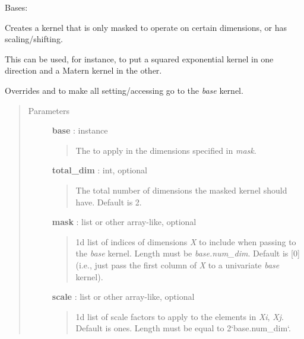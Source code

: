 \documentclass[letterpaper,10pt,english]{sphinxmanual}
\begin{document}
\begin{fulllineitems}
\label{gptools.kernel:gptools.kernel.core.MaskedKernel}
Bases: {\hyperref[gptools.kernel:gptools.kernel.core.Kernel]{}}

Creates a kernel that is only masked to operate on certain dimensions, or has scaling/shifting.

This can be used, for instance, to put a squared exponential kernel in one
direction and a Matern kernel in the other.

Overrides {\hyperref[gptools.kernel:gptools.kernel.core.MaskedKernel.__getattribute__]{}} and {\hyperref[gptools.kernel:gptools.kernel.core.MaskedKernel.__setattr__]{}} to make all
setting/accessing go to the \emph{base} kernel.
\begin{quote}\begin{description}
\item[{Parameters}] \leavevmode
\textbf{base} : {\hyperref[gptools.kernel:gptools.kernel.core.Kernel]{}} instance
\begin{quote}

The {\hyperref[gptools.kernel:gptools.kernel.core.Kernel]{}} to apply in the dimensions specified in \emph{mask}.
\end{quote}

\textbf{total\_dim} : int, optional
\begin{quote}

The total number of dimensions the masked kernel should have. Default
is 2.
\end{quote}

\textbf{mask} : list or other array-like, optional
\begin{quote}

1d list of indices of dimensions \emph{X} to include when passing to the
\emph{base} kernel. Length must be \emph{base.num\_dim}. Default is {[}0{]} (i.e.,
just pass the first column of \emph{X} to a univariate \emph{base} kernel).
\end{quote}

\textbf{scale} : list or other array-like, optional
\begin{quote}

1d list of scale factors to apply to the elements in \emph{Xi}, \emph{Xj}. Default
is ones. Length must be equal to 2{}`base.num\_dim{}`.
\end{quote}


\end{description}
\end{quote}
\end{fulllineitems}
\end{document}
